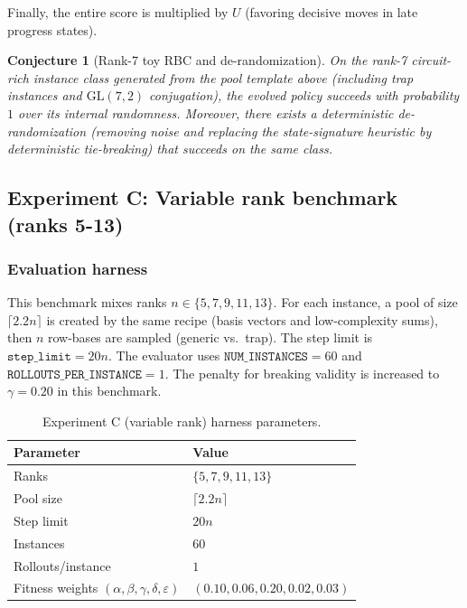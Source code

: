 \documentclass[11pt]{amsart}
\newtheorem{conjecture}{Conjecture}
\begin{document}
Finally, the entire score is multiplied by $U$ (favoring decisive moves in late progress states).

\begin{conjecture}[Rank-7 toy RBC and de-randomization]
\label{conj:toy7}
On the rank-7 circuit-rich instance class generated from the pool template above (including trap instances and $\mathrm{GL}(7,2)$ conjugation), the evolved policy succeeds with probability $1$ over its internal randomness.
Moreover, there exists a deterministic de-randomization (removing noise and replacing the state-signature heuristic by deterministic tie-breaking) that succeeds on the same class.
\end{conjecture}

\subsection{Experiment C: Variable rank benchmark (ranks 5-13)}
\label{sec:expC}

\subsubsection{Evaluation harness}

This benchmark mixes ranks $n\in\{5,7,9,11,13\}$.
For each instance, a pool of size $\lceil 2.2n\rceil$ is created by the same recipe (basis vectors and low-complexity sums), then $n$ row-bases are sampled (generic vs.\ trap).
The step limit is $\texttt{step\_limit}=20n$.
The evaluator uses $\texttt{NUM\_INSTANCES}=60$ and $\texttt{ROLLOUTS\_PER\_INSTANCE}=1$.
The penalty for breaking validity is increased to $\gamma=0.20$ in this benchmark.

\begin{table}[h]
\centering
\caption{Experiment C (variable rank) harness parameters.}
\begin{tabular}{@{}ll@{}}
\toprule
Parameter & Value \\
\midrule
Ranks & $\{5,7,9,11,13\}$ \\
Pool size & $\lceil 2.2n\rceil$ \\
Step limit & $20n$ \\
Instances & $60$ \\
Rollouts/instance & $1$ \\
Fitness weights $(\alpha,\beta,\gamma,\delta,\varepsilon)$ & $(0.10,0.06,0.20,0.02,0.03)$ \\
\bottomrule
\end{tabular}
\end{table}
\end{document}
